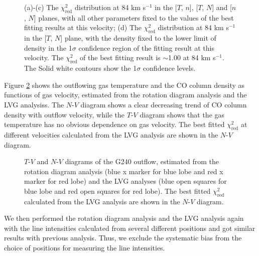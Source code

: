 \begin{figure}
\caption{(a)-(c) The $\chi^2_{\mathrm{red}}$ distribution at 84 km s$^{-1}$ in the [$T$, $n$], [$T$, $N$] and [$n$, $N$] planes, with all other parameters fixed to the values of the best fitting results at this velocity; (d) The $\chi^2_{\mathrm{red}}$ distribution at 84 km s$^{-1}$ in the [$T$, $N$] plane, with the density fixed to the lower limit of density in the 1$\sigma$ confidence region of the fitting result at this velocity. The $\chi^2_{\mathrm{red}}$ of the best fitting result is $\sim$1.00 at 84 km s$^{-1}$. The Solid white contours show the 1$\sigma$ confidence levels. \label{fig:fig4}}
\end{figure}

Figure \ref{fig:fig5} shows the outflowing gas temperature and the CO column density as functions of gas velocity, estimated from the rotation diagram analysis and the LVG analysiss. The $N$-$V$ diagram shows a clear decreasing trend of CO column density with outflow velocity, while the $T$-$V$ diagram shows that the gas temperature has no obvious dependence on gas velocity. The best fitted $\chi^2_{\mathrm{red}}$ at different velocities calculated from the LVG analysis are shown in the $N$-$V$ diagram. 

\begin{figure}
\caption{$T$-$V$ and $N$-$V$ diagrams of the G240 outflow, estimated from the rotation diagram analysis (blue x marker for blue lobe and red x marker for red lobe) and the LVG analyses (blue open squares for blue lobe and red open squares for red lobe). The best fitted $\chi^2_{\mathrm{red}}$ calculated from the LVG analysis are shown in the $N$-$V$ diagram. \label{fig:fig5}}
\end{figure}

We then performed the rotation diagram analysis and the LVG analysis again with the line intensities calculated from several different positions and got similar results with previous analysis. Thus, we exclude the systematic bias from the choice of positions for measuring the line intensities.
